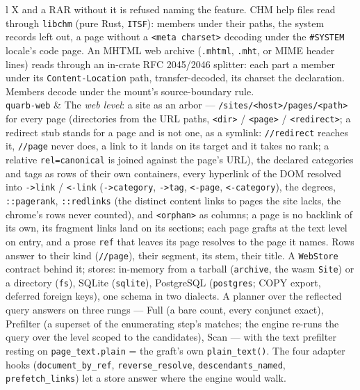 \documentclass{report}
\begin{document}
\begin{xltabular}{\textwidth}{l X}
  and a RAR without it is refused naming the feature. CHM help
  files read through \texttt{libchm} (pure Rust, \texttt{ITSF}):
  members under their paths, the system records left out, a page
  without a \texttt{<meta charset>} decoding under the
  \texttt{\#SYSTEM} locale's code page. An MHTML web archive
  (\texttt{.mhtml}, \texttt{.mht}, or MIME header lines) reads
  through an in-crate RFC 2045/2046 splitter: each part a member
  under its \texttt{Content-Location} path, transfer-decoded,
  its charset the declaration. Members decode under the mount's
  source-boundary rule. \\
\texttt{quarb-web} & The \emph{web level}: a site as an arbor —
  \texttt{/sites/<host>/pages/<path>} for every page (directories
  from the URL paths, \texttt{<dir>} / \texttt{<page>} /
  \texttt{<redirect>}; a redirect stub stands for a page and is
  not one, as a symlink: \texttt{//redirect} reaches it,
  \texttt{//page} never does, a link to it lands on its target
  and it takes no rank; a relative \texttt{rel=canonical} is
  joined against the page's URL), the declared categories and tags as rows
  of their own containers, every hyperlink of the DOM resolved
  into \texttt{->link} / \texttt{<-link} (\texttt{->category},
  \texttt{->tag}, \texttt{<-page}, \texttt{<-category}), the
  degrees, \texttt{::pagerank}, \texttt{::redlinks} (the distinct
  content links to pages the site lacks, the chrome's rows never
  counted), and \texttt{<orphan>} as columns; a page is no backlink
  of its own, its fragment links land on its sections; each page grafts at the text
  level on entry, and a prose \texttt{ref} that leaves its page
  resolves to the page it names. Rows answer to their kind
  (\texttt{//page}), their segment, its stem, their title. A
  \texttt{WebStore} contract behind it; stores: in-memory from a
  tarball (\texttt{archive}, the wasm \texttt{Site}) or a
  directory (\texttt{fs}), SQLite (\texttt{sqlite}), PostgreSQL
  (\texttt{postgres}; COPY export, deferred foreign keys), one
  schema in two dialects. A planner over the reflected query
  answers on three rungs — Full (a bare count, every conjunct
  exact), Prefilter (a superset of the enumerating step's
  matches; the engine re-runs the query over the level scoped to
  the candidates), Scan — with the text prefilter resting on
  \texttt{page\_text.plain} = the graft's own
  \texttt{plain\_text()}. The four adapter hooks
  (\texttt{document\_by\_ref}, \texttt{reverse\_resolve},
  \texttt{descendants\_named}, \texttt{prefetch\_links}) let a
  store answer where the engine would walk.

\end{xltabular}
\end{document}
